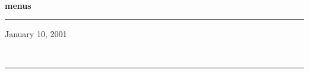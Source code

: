 \documentclass[11pt]{report}
\begin{document}
    \begin{titlepage}

        \vspace*{0.25\textheight}
        \\

\bigskip\noindent
{\Huge\bf menus}\\
        \rule{\textwidth}{1.5mm}
        \begin{flushright}
            January 10, 2001
        \end{flushright}
        \vfill
        \\
        \rule{\textwidth}{0.75mm}
        \vspace*{0.1\textheight}

    \end{titlepage}

    \setcounter{section}{1}
    \vfil\eject
        
        \vfil\eject
        
        \vfil\eject
        
\end{document}
